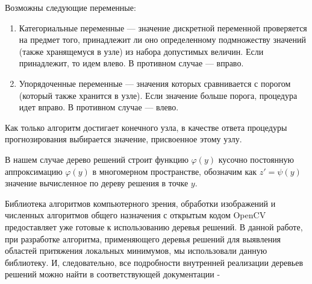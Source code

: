 \documentclass[12pt, a4paper, russian]{article}
\begin{document}
Возможны следующие переменные:
\begin{enumerate}

	\item Категориальные переменные --- значение дискретной переменной проверяется на предмет того, принадлежит ли оно определенному подмножеству значений (также хранящемуся в узле) из набора допустимых величин. Если принадлежит, то идем влево. В противном случае --- вправо. 

	\item Упорядоченные переменные --- значения которых сравнивается с порогом (который также хранится в узле). Если значение больше порога, процедура идет вправо. В противном случае --- влево.
\end{enumerate}

Как только алгоритм достигает конечного узла, в качестве ответа процедуры прогнозирования выбирается значение, присвоенное этому узлу. 

В нашем случае дерево решений строит функцию $\varphi(y)$ кусочно постоянную аппроксимацию $\varphi(y)$  в многомерном пространстве, обозначим как $z' = \psi(y)$ значение вычисленное по дереву решения в точке $y$.

Библиотека алгоритмов компьютерного зрения, обработки изображений и численных алгоритмов общего назначения с открытым кодом OpenCV \cite{Brahmbhatt2013} предоставляет уже готовые к использованию деревья решений. В данной работе, при разработке алгоритма, применяющего деревья решений для выявления областей притяжения локальных минимумов, мы использовали данную библиотеку. И, следовательно, все подробности внутренней реализации деревьев решений можно найти в соответствующей документации - \cite{fio_bib16}
\end{document}
